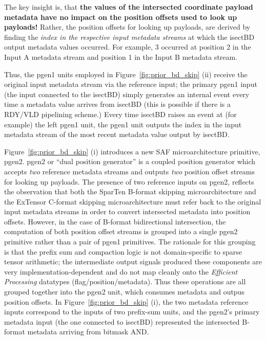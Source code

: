 The key insight is, that \textbf{the values of the intersected coordinate payload metadata have no impact on the position offsets used to look up payloads!} Rather, the position offsets for looking up payloads, are derived by finding the \textit{index in the respective input metadata streams} at which the isectBD output metadata values occurred. For example, 3 occurred at position 2 in the Input A metadata stream and position 1 in the Input B metadata stream. 

Thus, the pgen1 units employed in Figure~\ref{fig:prior_bd_skip} (ii) receive the original input metadata stream via the reference input; the primary pgen1 input (the input connected to the isectBD) simply generates an internal event every time a metadata value arrives from isectBD (this is possible if there is a RDY/VLD pipelining scheme.) Every time isectBD raises an event at (for example) the left pgen1 unit, the pgen1 unit outputs the index in the input metadata stream of the most recent metadata value output by isectBD.

Figure~\ref{fig:prior_bd_skip} (i) introduces a new SAF microarchitecture primitive, pgen2. pgen2 or ``dual position generator'' is a coupled position generator which accepts \textit{two} reference metadata streams and outputs \textit{two} position offset streams for looking up payloads. The presence of two reference inputs on pgen2, reflects the observation that both the SparTen B-format skipping microarchitecture and the ExTensor C-format skipping microarchitecture must refer back to the original input metadata streams in order to convert intersected metadata into position offsets. However, in the case of B-format bidirectional intersection, the computation of both position offset streams is grouped into a single pgen2 primitive rather than a pair of pgen1 primitives. The rationale for this grouping is that the prefix sum and compaction logic is not domain-specific to sparse tensor arithmetic; the intermediate output signals produced these components are very implementation-dependent and do not map cleanly onto the \textit{Efficient Processing} datatypes (flag/position/metadata). Thus these operations are all grouped together into the pgen2 unit, which consumes metadata and outpus position offsets. In Figure~\ref{fig:prior_bd_skip} (i), the two metadata reference inputs correspond to the inputs of two prefix-sum units, and the pgen2's primary metadata input (the one connected to isectBD) represented the intersected B-format metadata arriving from bitmask AND.

